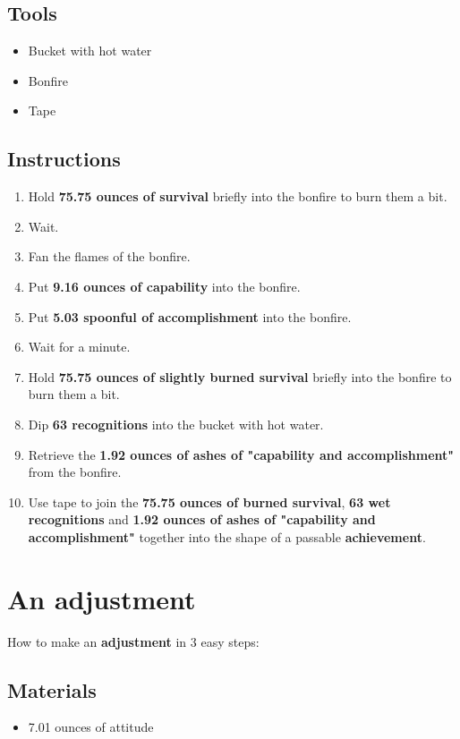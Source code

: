 \documentclass{article}
\begin{document}
\subsection{Tools}\begin{itemize}
\item 
Bucket with hot water
\item 
Bonfire
\item 
Tape
\end{itemize}
\subsection{Instructions}\begin{enumerate}
\item 
Hold \textbf{75.75 ounces of survival} briefly into the bonfire to burn them a bit.
\item 
Wait.
\item 
Fan the flames of the bonfire.
\item 
Put \textbf{9.16 ounces of capability} into the bonfire.
\item 
Put \textbf{5.03 spoonful of accomplishment} into the bonfire.
\item 
Wait for a minute.
\item 
Hold \textbf{75.75 ounces of slightly burned survival} briefly into the bonfire to burn them a bit.
\item 
Dip \textbf{63 recognitions} into the bucket with hot water.
\item 
Retrieve the \textbf{1.92 ounces of ashes of "capability and accomplishment"} from the bonfire.
\item 
Use tape to join the \textbf{75.75 ounces of burned survival}, \textbf{63 wet recognitions} and \textbf{1.92 ounces of ashes of "capability and accomplishment"} together into the shape of a passable \textbf{achievement}.
\end{enumerate}
\newpage
\section{An adjustment}How to make an \textbf{adjustment} in 3 easy steps:

\subsection{Materials}\begin{itemize}
\item 
7.01 ounces of attitude
\end{itemize}
\end{document}
